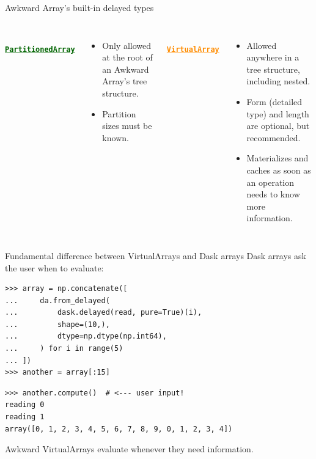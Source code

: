 \documentclass[aspectratio=169]{beamer}
\begin{document}
\begin{frame}{Awkward Array's built-in delayed types}
\Large
\vspace{0.25 cm}
\begin{columns}[t]
\mbox{ } \hfill \textcolor{darkgreen}{\underline{\tt\textbf{PartitionedArray}}} \hfill \mbox{ }

\vspace{0.25 cm}
\begin{itemize}
\item Only allowed at the root of an Awkward Array's tree structure.

\item Partition sizes must be known.

\end{itemize}

\mbox{ } \hfill \textcolor{darkorange}{\underline{\tt\textbf{VirtualArray}}} \hfill \mbox{ }

\vspace{0.25 cm}
\begin{itemize}
\item Allowed anywhere in a tree structure, including nested.

\item Form (detailed type) and length are optional, but recommended.

\item Materializes and caches as soon as an operation needs to know more information.

\end{itemize}

\end{columns}
\end{frame}

\begin{frame}[fragile]{Fundamental difference between VirtualArrays and Dask arrays}
\Large
\vspace{0.25 cm}
Dask arrays ask the user when to evaluate:

\small
\begin{verbatim}
>>> array = np.concatenate([
...     da.from_delayed(
...         dask.delayed(read, pure=True)(i),
...         shape=(10,),
...         dtype=np.dtype(np.int64),
...     ) for i in range(5)
... ])
>>> another = array[:15]
\end{verbatim}
\begin{verbatim}
>>> another.compute()  # <--- user input!
reading 0
reading 1
array([0, 1, 2, 3, 4, 5, 6, 7, 8, 9, 0, 1, 2, 3, 4])
\end{verbatim}

\Large
\vspace{0.5 cm}
Awkward VirtualArrays evaluate whenever they need information.
\end{frame}
\end{document}
